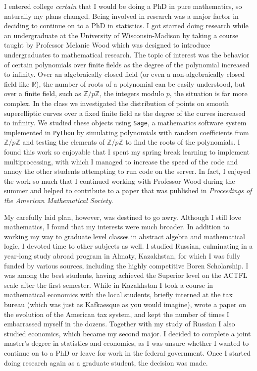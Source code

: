 \documentclass[12pt]{article}
\title{}
\author{}
\begin{document}

I entered college \emph{certain} that I would be doing a PhD in pure mathematics, so naturally my plans changed.  Being involved in research was a major factor in deciding to continue on to a PhD in statistics.  I got started doing research while an undergraduate at the University of Wisconsin-Madison by taking a course taught by Professor Melanie Wood which was designed to introduce undergraduates to mathematical research.  The topic of interest was the behavior of certain polynomials over finite fields as the degree of the polynomial increased to infinity.  Over an algebraically closed field (or even a non-algebraically closed field like $\mathbb{R}$), the number of roots of a polynomial can be easily understood, but over a finite field, such as $\mathbb{Z}/p\mathbb{Z}$, the integers modulo $p$, the situation is far more complex.  In the class we investigated the distribution of points on smooth superelliptic curves over a fixed finite field as the degree of the curves increased to infinity.  We studied these objects using \texttt{Sage}, a mathematics software system implemented in \texttt{Python} by simulating polynomials with random coefficients from $\mathbb{Z}/p\mathbb{Z}$ and testing the elements of $\mathbb{Z}/p\mathbb{Z}$ to find the roots of the polynomials.  I found this work so enjoyable that I spent my spring break learning to implement multiprocessing, with which I managed to increase the speed of the code and annoy the other students attempting to run code on the server.  In fact, I enjoyed the work so much that I continued working with Professor Wood during the summer and helped to contribute to a paper that was published in \emph{Proceedings of the American Mathematical Society}.  


My carefully laid plan, however, was destined to go awry.  Although I still love mathematics, I found that my interests were much broader.  In addition to working my way to graduate level classes in abstract algebra and mathematical logic, I devoted time to other subjects as well.  I studied Russian, culminating in a year-long study abroad program in Almaty, Kazakhstan, for which I was fully funded by various sources, including the highly competitive Boren Scholarship.  I was among the best students, having achieved the Superior level on the ACTFL scale after the first semester.  While in Kazakhstan I took a course in mathematical economics with the local students, briefly interned at the tax bureau (which was just as Kafkaesque as you would imagine), wrote a paper on the evolution of the American tax system, and kept the number of times I embarrassed myself in the dozens.  Together with my study of Russian I also studied economics, which became my second major.  I decided to complete a joint master's degree in statistics and economics, as I was unsure whether I wanted to continue on to a PhD or leave for work in the federal government.  Once I started doing research again as a graduate student, the decision was made.    
\end{document}
